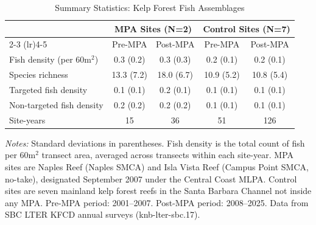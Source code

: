 \begin{table}[t]
\centering
\caption{Summary Statistics: Kelp Forest Fish Assemblages}
\label{tab:sumstats}
\begin{threeparttable}
\begin{tabular}{lcccc}
\toprule
 & \multicolumn{2}{c}{MPA Sites (N=2)} & \multicolumn{2}{c}{Control Sites (N=7)} \\
\cmidrule(lr){2-3} \cmidrule(lr){4-5}
 & Pre-MPA & Post-MPA & Pre-MPA & Post-MPA \\
\midrule
Fish density (per 60m$^2$) & 0.3 (0.2) & 0.3 (0.3) & 0.2 (0.1) & 0.2 (0.1) \\
Species richness & 13.3 (7.2) & 18.0 (6.7) & 10.9 (5.2) & 10.8 (5.4) \\
Targeted fish density & 0.1 (0.1) & 0.2 (0.1) & 0.1 (0.1) & 0.1 (0.1) \\
Non-targeted fish density & 0.2 (0.2) & 0.2 (0.2) & 0.1 (0.1) & 0.1 (0.1) \\
\midrule
Site-years & 15 & 36 & 51 & 126 \\
\bottomrule
\end{tabular}
\begin{tablenotes}[flushleft]
\footnotesize
\item \textit{Notes:} Standard deviations in parentheses. Fish density is the total count of fish per 60m$^2$ transect area, averaged across transects within each site-year. MPA sites are Naples Reef (Naples SMCA) and Isla Vista Reef (Campus Point SMCA, no-take), designated September 2007 under the Central Coast MLPA. Control sites are seven mainland kelp forest reefs in the Santa Barbara Channel not inside any MPA. Pre-MPA period: 2001--2007. Post-MPA period: 2008--2025. Data from SBC LTER KFCD annual surveys (knb-lter-sbc.17).
\end{tablenotes}
\end{threeparttable}
\end{table}
